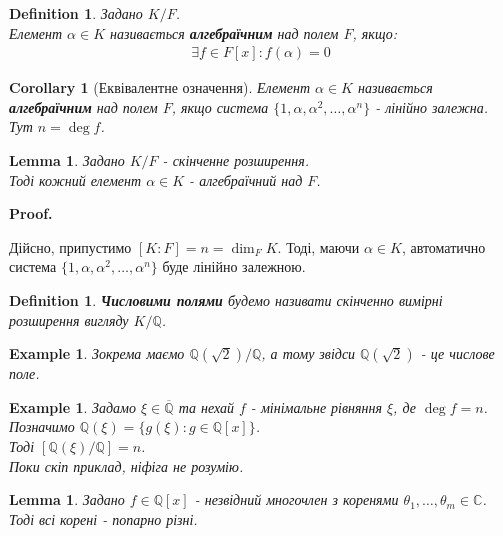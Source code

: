 \documentclass[a4paper, 14pt]{extarticle}
\makeatletter
\theoremstyle{theoremdd}
\theoremstyle{theoremdd}
\newtheorem{definition}[theorem]{Definition}
\theoremstyle{theoremdd}
\theoremstyle{theoremdd}
\newtheorem{example}[theorem]{Example}
\theoremstyle{theoremdd}
\theoremstyle{theoremdd}
\theoremstyle{theoremdd}
\newtheorem{lemma}[theorem]{Lemma}
\theoremstyle{theoremdd}
\newtheorem{corollary}[theorem]{Corollary}
\def\qed{$\blacksquare$}
\renewenvironment{proof}[1][Proof.\\]{\par
\pushQED{\hfill \qed}%
\normalfont \topsep6\p@\@plus6\p@\relax
\trivlist
\item\relax
{\bfseries
#1\@addpunct{.}}\hspace\labelsep\ignorespaces
}{%
\popQED\endtrivlist\@endpefalse
}
\makeatother
\begin{document}
\begin{definition}
Задано $K/F$.\\
Елемент $\alpha \in K$ називається \textbf{алгебраїчним} над полем $F$, якщо:
\begin{align*}
\exists f \in F[x]: f(\alpha) = 0
\end{align*}
\end{definition}

\begin{corollary}[Еквівалентне означення]
Елемент $\alpha \in K$ називається \textbf{алгебраїчним} над полем $F$, якщо система $\{1,\alpha,\alpha^2,\dots,\alpha^n\}$ - лінійно залежна.\\
Тут $n = \deg f$.
\end{corollary}

\begin{lemma}
Задано $K/F$ - скінченне розширення.\\
Тоді кожний елемент $\alpha \in K$ - алгебраїчний над $F$.
\end{lemma}

\begin{proof}
Дійсно, припустимо $[K:F] = n = \dim_F K$. Тоді, маючи $\alpha \in K$, автоматично система $\{1,\alpha,\alpha^2,\dots,\alpha^n\}$ буде лінійно залежною.
\end{proof}

\begin{definition}
\textbf{Числовими полями} будемо називати скінченно вимірні розширення вигляду $K / \mathbb{Q}$.
\end{definition}

\begin{example}
Зокрема маємо $\mathbb{Q}(\sqrt{2}) / \mathbb{Q}$, а тому звідси $\mathbb{Q}(\sqrt{2})$ - це числове поле.
\end{example}

\begin{example}
Задамо $\xi \in \overline{\mathbb{Q}}$ та нехай $f$ - мінімальне рівняння $\xi$, де $\deg f = n$.\\
Позначимо $\mathbb{Q}(\xi) = \{ g(\xi) : g \in \mathbb{Q}[x] \}$.\\
Тоді $[\mathbb{Q}(\xi) / \mathbb{Q}] = n$.\\
\textit{Поки скіп приклад, ніфіга не розумію.}
\end{example}

\begin{lemma}
Задано $f \in \mathbb{Q}[x]$ - незвідний многочлен з коренями $\theta_1,\dots,\theta_m \in \mathbb{C}$.\\
Тоді всі корені - попарно різні.
\end{lemma}
\end{document}
